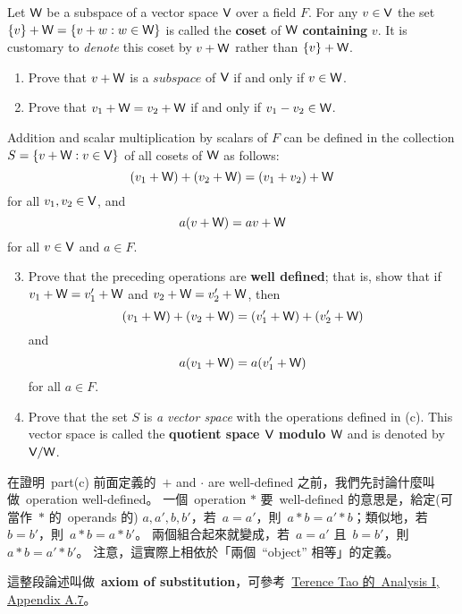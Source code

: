 \begin{exercise} \label{exercise 1.3.31}
Let \(\textsf{W}\) be a subspace of a vector space \(\textsf{V}\) over a field \(F\).
For any \(v \in \textsf{V}\) the set \(\{v\} + \textsf{W} = \{v + w : w \in \textsf{W}\}\) is called the \textbf{coset} of \(\textsf{W}\) \textbf{containing} \(v\).
It is customary to \emph{denote} this coset by \(v + \textsf{W}\) rather than \(\{v\} + \textsf{W}\).
\begin{enumerate}
    \item Prove that \(v + \textsf{W}\) is a \(subspace\) of \(\textsf{V}\) if and only if \(v \in \textsf{W}\).
    \item Prove that \(v_1 + \textsf{W} = v_2 + \textsf{W}\) if and only if \(v_1 - v_2 \in \textsf{W}\).
\end{enumerate}
Addition and scalar multiplication by scalars of \(F\) can be defined in the collection \(S = \{v + \textsf{W}: v \in \textsf{V}\}\) of all cosets of \(\textsf{W}\) as follows:
\[
    (v_1 + \textsf{W}) + (v_2 + \textsf{W}) = (v_1 + v_2) + \textsf{W}
\]
for all \(v_1, v_2 \in \textsf{V}\), and
\[
    a(v + \textsf{W}) = av + \textsf{W}
\]
for all \(v \in \textsf{V}\) and \(a \in F\).
\begin{enumerate}
    \setcounter{enumi}{2}
    \item Prove that the preceding operations are \textbf{well defined};
        that is, show that if \(v_1 + \textsf{W} = v_1' + \textsf{W}\) and \(v_2 + \textsf{W} = v_2' + \textsf{W}\), then
        \[
            (v_1 + \textsf{W}) + (v_2 + \textsf{W}) = (v_1' + \textsf{W}) + (v_2' + \textsf{W})
        \]
        and
        \[
            a(v_1 + \textsf{W}) = a(v_1' + \textsf{W})
        \]
        for all \(a \in F\).
    \item Prove that the set \(S\) is \emph{a vector space} with the operations defined in (c).
    This vector space is called the \textbf{quotient space \(\textsf{V}\) modulo \(\textsf{W}\)} and is denoted by \(\textsf{V} / \textsf{W}\).
\end{enumerate}
\end{exercise}

\begin{note}
在證明\ part(c) 前面定義的\ \(+\) and \(\cdot\) are well-defined 之前，我們先討論什麼叫做\ operation well-defined。
一個\ operation \(*\) 要\ well-defined 的意思是，給定(可當作\ \(*\) 的\ operands 的) \(a, a', b, b'\)，若\ \(a = a'\)，則\ \(a * b = a' * b\)；類似地，若\ \(b = b'\)，則\ \(a * b = a * b'\)。
兩個組合起來就變成，若\ \(a = a'\) 且\ \(b = b'\)，則\ \(a * b = a' * b'\)。
注意，這實際上相依於「兩個\ ``object'' 相等」的定義。

這整段論述叫做\ \textbf{axiom of substitution}，可參考\ \href{https://link.springer.com/book/10.1007/978-981-10-1789-6}{Terence Tao 的\ Analysis I, Appendix A.7}。
\end{note}

